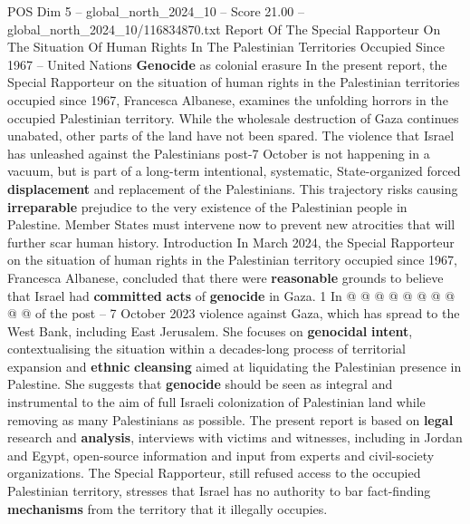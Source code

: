 \begin{textsample}{POS Dim 5 – global\_north\_2024\_10 – Score 21.00 – global\_north\_2024\_10/116834870.txt}  \label{ex:f5_pos_402}
Report Of The Special Rapporteur On The Situation Of Human Rights In The Palestinian Territories Occupied Since 1967 -- United Nations \textbf{Genocide} as colonial erasure In the present report, the Special Rapporteur on the situation of human rights in the Palestinian territories occupied since 1967, Francesca Albanese, examines the unfolding horrors in the occupied Palestinian territory.
While the wholesale destruction of Gaza continues unabated, other parts of the land have not been spared.
The violence that Israel has unleashed against the Palestinians post-7 October is not happening in a vacuum, but is part of a long-term intentional, systematic, State-organized forced \textbf{displacement} and replacement of the Palestinians.
This trajectory risks causing \textbf{irreparable} prejudice to the very existence of the Palestinian people in Palestine.
Member States must intervene now to prevent new atrocities that will further scar human history.
Introduction In March 2024, the Special Rapporteur on the situation of human rights in the Palestinian territory occupied since 1967, Francesca Albanese, concluded that there were \textbf{reasonable} grounds to believe that Israel had \textbf{committed} \textbf{acts} of \textbf{genocide} in Gaza. 1 In @ @ @ @ @ @ @ @ @ @ of the post -- 7 October 2023 violence against Gaza, which has spread to the West Bank, including East Jerusalem.
She focuses on \textbf{genocidal} \textbf{intent}, contextualising the situation within a decades-long process of territorial expansion and \textbf{ethnic} \textbf{cleansing} aimed at liquidating the Palestinian presence in Palestine.
She suggests that \textbf{genocide} should be seen as integral and instrumental to the aim of full Israeli colonization of Palestinian land while removing as many Palestinians as possible.
The present report is based on \textbf{legal} research and \textbf{analysis}, interviews with victims and witnesses, including in Jordan and Egypt, open-source information and input from experts and civil-society organizations.
The Special Rapporteur, still refused access to the occupied Palestinian territory, stresses that Israel has no authority to bar fact-finding \textbf{mechanisms} from the territory that it illegally occupies.

\end{textsample}
